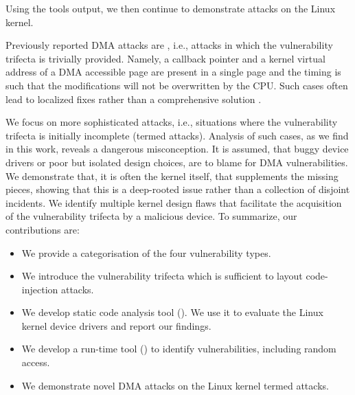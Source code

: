 Using the tools output, we then continue to demonstrate attacks on the Linux kernel.

Previously reported DMA attacks are \simple, i.e., attacks in which the vulnerability trifecta is trivially provided. Namely, a callback pointer and a kernel virtual address of a DMA accessible page are present in a single page and the timing is such that the modifications will not be overwritten by the CPU. Such cases often lead to localized fixes rather than a comprehensive solution \cite{thunder}.


We focus on more sophisticated attacks, i.e., situations where the vulnerability trifecta is initially incomplete (termed \compound attacks).
Analysis of such cases, as we find in this work, reveals a dangerous misconception. It is assumed, that buggy device drivers or poor but isolated design choices, are to blame for DMA vulnerabilities. 
We demonstrate that, it is often the kernel itself, that supplements the missing pieces, showing that this is a deep-rooted issue rather than a collection of disjoint incidents.
We identify multiple kernel design flaws that facilitate the acquisition of the vulnerability trifecta by a malicious device.
To summarize, our contributions are:
\begin{itemize}
    \item We provide a categorisation of the four \subpage{} vulnerability types.
    \item We introduce the vulnerability trifecta which is sufficient to layout code-injection attacks.
    \item We develop static code analysis tool (\tool). We use it to evaluate the Linux kernel device drivers and report our findings.
    \item We develop a run-time tool (\dkasan) to identify \subpage{} vulnerabilities, including random access.
    \item We demonstrate novel DMA attacks on the Linux kernel termed \compound{} attacks.
\end{itemize}



